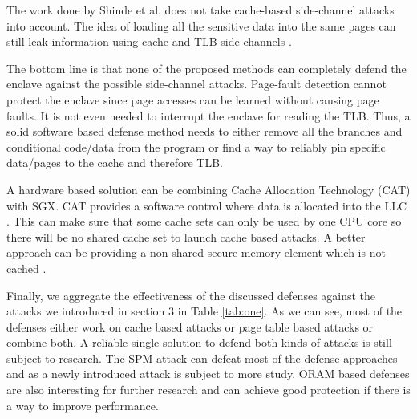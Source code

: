 The work done by Shinde et al. \cite{pigeonhole} does not take cache-based side-channel attacks into account. The idea of loading all the sensitive data into the same pages can still leak information using cache and TLB side channels \cite{leakycauldron}.

The bottom line is that none of the proposed methods can completely defend the enclave against the possible side-channel attacks. Page-fault detection cannot protect the enclave since page accesses can be learned without causing page faults. It is not even needed to interrupt the enclave for reading the TLB. Thus, a solid software based defense method needs to either remove all the branches and conditional code/data from the program or find a way to reliably pin specific data/pages to the cache and therefore TLB.

A hardware based solution can be combining Cache Allocation Technology (CAT) with SGX. CAT provides a software control where data is allocated into the LLC \cite{cat}. This can make sure that some cache sets can only be used by one CPU core so there will be no shared cache set to launch cache based attacks. A better approach can be providing a non-shared secure memory element which is not cached \cite{mge}.

Finally, we aggregate the effectiveness of the discussed defenses against the attacks we introduced in section 3 in Table \ref{tab:one}. As we can see, most of the defenses either work on cache based attacks or page table based attacks or combine both. A reliable single solution to defend both kinds of attacks is still subject to research. The SPM attack can defeat most of the defense approaches and as a newly introduced attack is subject to more study. ORAM based defenses are also interesting for further research and can achieve good protection if there is a way to improve performance.

